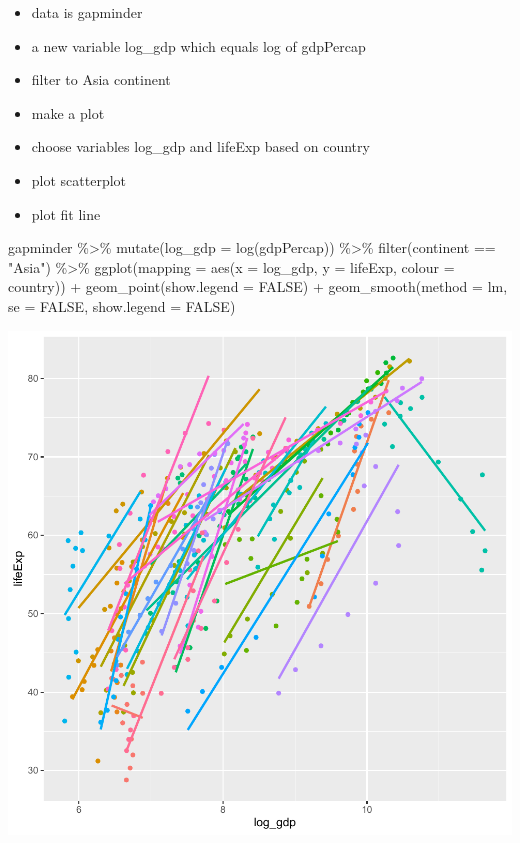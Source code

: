\documentclass[
]{book}
\makeatletter
\newenvironment{Shaded}{\begin{snugshade}}{\end{snugshade}}
\newcommand{\AttributeTok}[1]{\textcolor[rgb]{0.61,0.61,0.61}{#1}}
\newcommand{\ConstantTok}[1]{\textcolor[rgb]{0,0,0}{#1}}
\newcommand{\FunctionTok}[1]{\textcolor[rgb]{0,0,0}{#1}}
\newcommand{\NormalTok}[1]{#1}
\newcommand{\SpecialCharTok}[1]{\textcolor[rgb]{0,0,0}{#1}}
\newcommand{\StringTok}[1]{\textcolor[rgb]{0.5,0.5,0.5}{#1}}
\providecommand{\tightlist}{%
  \setlength{\itemsep}{0pt}\setlength{\parskip}{0pt}}
\newenvironment{kframe}{%
\medskip{}
\setlength{\fboxsep}{.8em}
 \def\at@end@of@kframe{}%
 \ifinner\ifhmode%
  \def\at@end@of@kframe{\end{minipage}}%
  \begin{minipage}{\columnwidth}%
 \fi\fi%
 \def\FrameCommand##1{\hskip\@totalleftmargin \hskip-\fboxsep
 \colorbox{shadecolor}{##1}\hskip-\fboxsep
     \hskip-\linewidth \hskip-\@totalleftmargin \hskip\columnwidth}%
 \MakeFramed {\advance\hsize-\width
   \@totalleftmargin\z@ \linewidth\hsize
   \@setminipage}}%
 {\par\unskip\endMakeFramed%
 \at@end@of@kframe}
\renewenvironment{Shaded}{\begin{kframe}}{\end{kframe}}
\makeatother
\begin{document}
\begin{itemize}
\tightlist
\item
  data is gapminder
\item
  a new variable log\_gdp which equals log of gdpPercap
\item
  filter to Asia continent
\item
  make a plot
\item
  choose variables log\_gdp and lifeExp based on country
\item
  plot scatterplot
\item
  plot fit line
\end{itemize}

\begin{Shaded}
\begin{Highlighting}[]
\NormalTok{gapminder }\SpecialCharTok{\%\textgreater{}\%} \FunctionTok{mutate}\NormalTok{(}\AttributeTok{log\_gdp =} \FunctionTok{log}\NormalTok{(gdpPercap)) }\SpecialCharTok{\%\textgreater{}\%}
  \FunctionTok{filter}\NormalTok{(continent }\SpecialCharTok{==} \StringTok{"Asia"}\NormalTok{) }\SpecialCharTok{\%\textgreater{}\%}
\FunctionTok{ggplot}\NormalTok{(}\AttributeTok{mapping =} \FunctionTok{aes}\NormalTok{(}\AttributeTok{x =}\NormalTok{ log\_gdp, }\AttributeTok{y =}\NormalTok{ lifeExp, }\AttributeTok{colour =}\NormalTok{ country)) }\SpecialCharTok{+}
  \FunctionTok{geom\_point}\NormalTok{(}\AttributeTok{show.legend =} \ConstantTok{FALSE}\NormalTok{) }\SpecialCharTok{+}
  \FunctionTok{geom\_smooth}\NormalTok{(}\AttributeTok{method =}\NormalTok{ lm, }\AttributeTok{se =} \ConstantTok{FALSE}\NormalTok{, }\AttributeTok{show.legend =} \ConstantTok{FALSE}\NormalTok{)}
\end{Highlighting}
\end{Shaded}

\begin{center}\includegraphics[width=0.7\linewidth,keepaspectratio]{Multivariable_Data_Analysis_files/figure-latex/unnamed-chunk-95-1} \end{center}
\end{document}
